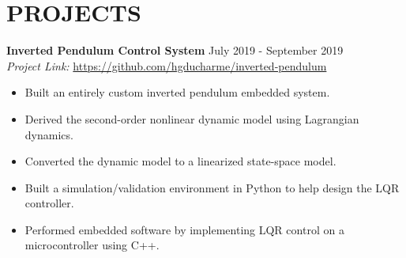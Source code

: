 \documentclass[a4paper,9pt]{extarticle}
\begin{document}
\newcommand{\InvertedPendulum}{
\noindent
\textbf{Inverted Pendulum Control System} \hfill July 2019 - September 2019\\
\textit{Project Link:} \url{https://github.com/hgducharme/inverted-pendulum}
\begin{itemize}
    \item Built an entirely custom inverted pendulum embedded system.
    \item Derived the second-order nonlinear dynamic model using Lagrangian dynamics.
    \item Converted the dynamic model to a linearized state-space model.
    \item Built a simulation/validation environment in Python to help design the LQR controller.
    \item Performed embedded software by implementing LQR control on a microcontroller using C++.
\end{itemize}
}

\section*{PROJECTS}

\Meatball
\InvertedPendulum


\newcommand{\EngineeringSkills}{
\section*{SKILLS \& COURSEWORK}
\begin{itemize}
    \item \textbf{Programming Languages:} Python, C++, Node.js, HTML, CSS, JavaScript, Bash
    \item \textbf{Math Coursework:} Real analysis, abstract algebra, differential geometry, complex analysis, partial differential equations, linear algebra I \& II, numerical methods, discrete mathematics, probability
    \item \textbf{Engineering Coursework:} Spacecraft attitude dynamics and control (graduate level), vehicle stability and control, active controls, numerical methods, astrodynamics, computational aerospace structural design (graduate level)
\end{itemize}
}
\end{document}
